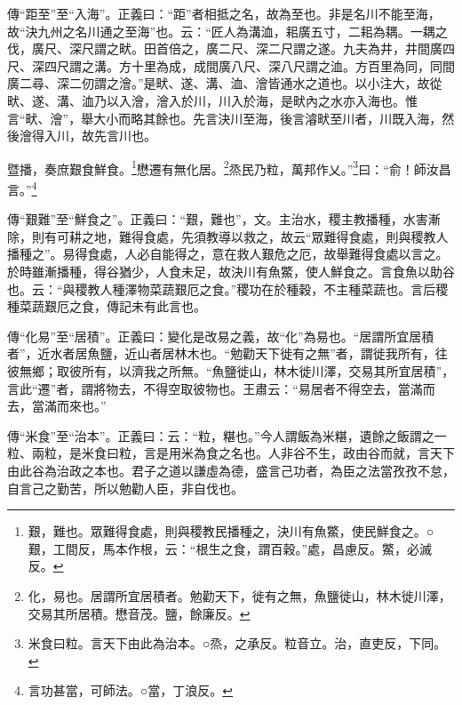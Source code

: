 {\noindent\zhuan{}\fzbyks 傳“距至”至“入海”。正義曰：“距”者相抵之名，故為至也。非是名川不能至海，故“決九州之名川通之至海”也。云：“匠人為溝洫，耜廣五寸，二耜為耦。一耦之伐，廣尺、深尺謂之畎。田首倍之，廣二尺、深二尺謂之遂。九夫為井，井間廣四尺、深四尺謂之溝。方十里為成，成間廣八尺、深八尺謂之洫。方百里為同，同間廣二尋、深二仞謂之澮。”是畎、遂、溝、洫、澮皆通水之道也。以小注大，故從畎、遂、溝、洫乃以入澮，澮入於川，川入於海，是畎內之水亦入海也。惟言“畎、澮”，舉大小而略其餘也。先言決川至海，後言濬畎至川者，川既入海，然後澮得入川，故先言川也。 \par}

暨播，奏庶艱食鮮食。\footnote{艱，難也。眾難得食處，則與稷教民播種之，決川有魚鱉，使民鮮食之。○艱，工間反，馬本作根，云：“根生之食，謂百穀。”處，昌慮反。鱉，必滅反。}懋遷有無化居。\footnote{化，易也。居謂所宜居積者。勉勸天下，徙有之無，魚鹽徙山，林木徙川澤，交易其所居積。懋音茂。鹽，餘廉反。}烝民乃粒，萬邦作乂。”\footnote{米食曰粒。言天下由此為治本。○烝，之承反。粒音立。治，直吏反，下同。}曰：“俞！師汝昌言。”\footnote{言功甚當，可師法。○當，丁浪反。}

{\noindent\zhuan{}\fzbyks 傳“艱難”至“鮮食之”。正義曰：“艱，難也”，文。主治水，稷主教播種，水害漸除，則有可耕之地，難得食處，先須教導以救之，故云“眾難得食處，則與稷教人播種之”。易得食處，人必自能得之，意在救人艱危之厄，故舉難得食處以言之。於時雖漸播種，得谷猶少，人食未足，故決川有魚鱉，使人鮮食之。言食魚以助谷也。云：“與稷教人種澤物菜蔬艱厄之食。”稷功在於種穀，不主種菜蔬也。言后稷種菜蔬艱厄之食，傳記未有此言也。 \par}

{\noindent\zhuan{}\fzbyks 傳“化易”至“居積”。正義曰：變化是改易之義，故“化”為易也。“居謂所宜居積者”，近水者居魚鹽，近山者居林木也。“勉勸天下徙有之無”者，謂徙我所有，往彼無鄉；取彼所有，以濟我之所無。“魚鹽徙山，林木徙川澤，交易其所宜居積”，言此“遷”者，謂將物去，不得空取彼物也。王肅云：“易居者不得空去，當滿而去，當滿而來也。” \par}

{\noindent\zhuan{}\fzbyks 傳“米食”至“治本”。正義曰：云：“粒，糂也。”今人謂飯為米糂，遺餘之飯謂之一粒、兩粒，是米食曰粒，言是用米為食之名也。人非谷不生，政由谷而就，言天下由此谷為治政之本也。君子之道以謙虛為德，盛言己功者，為臣之法當孜孜不怠，自言己之勤苦，所以勉勸人臣，非自伐也。 \par}


